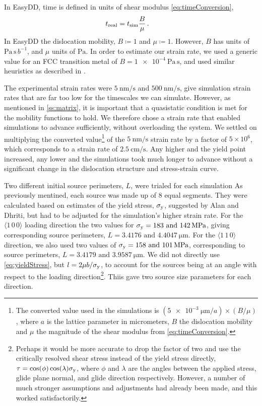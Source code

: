 In EasyDD, time is defined in units of shear modulus \cref{eq:timeConversion},
\begin{align}\label{eq:timeConversion}
    t_{\textrm{real}} & = t_{\textrm{sim}} \dfrac{B}{\mu}\,.
\end{align}
In EasyDD the dislocation mobility, $B \coloneqq 1$ and $\mu \coloneqq 1$. However, $B$ has units of $\si{\pascal\,\second\,b^{-1}}$, and $\mu$ units of $\si{\pascal}$. In order to estimate our strain rate, we used a generic value for an FCC transition metal of $B = \SI{1e-4}{\pascal\,\second}$, and used similar heuristics as described in \cite[p.~237]{ddlab}.

The experimental strain rates were $\SI{5}{\nano\metre\per\second}$ and $\SI{500}{\nano\metre\per\second}$, give simulation strain rates that are far too low for the timescales we can simulate. However, as mentioned in \cref{ss:matrix}, it is important that a quasistatic condition is met for the mobility functions to hold. We therefore chose a strain rate that enabled simulations to advance sufficiently, without overloading the system. We settled on multiplying the converted value\footnote{The converted value used in the simulations is $\left(\SI{5e-3}{\micro\metre}/a\right) \times \left(B /  \mu \right)$, where $a$ is the lattice parameter in micrometers, $B$ the dislocation mobility and $ \mu $ the magnitude of the shear modulus from \cref{eq:timeConversion}.} of the $\SI{5}{\nano\metre\per\second}$ strain rate by a factor of $5 \times 10^6$, which corresponds to a strain rate of $\SI{2.5}{\centi\metre\per\second}$. Any higher and the yield point increased, any lower and the simulations took much longer to advance without a significant change in the dislocation structure and stress-strain curve.

Two different initial source perimeters, $L$, were trialed for each simulation As previously mentined, each source was made up of 8 equal segments. They were calculated based on estimates of the yield stress, $\sigma_{\textrm{y}}$, suggested by Alan and Dhriti, but had to be adjusted for the simulation's higher strain rate. For the $\langle 1\, 0\, 0 \rangle$ loading direction the two values for $\sigma_{\textrm{y}} = 183 \text{ and } \SI{142}{\mega\pascal}$, giving corresponding source perimeters, $L = 3.4176 \text{ and } \SI{4.4047}{\micro\metre}$. For the $\langle 1\, 1\, 0 \rangle$ direction, we also used two values of $\sigma_{\textrm{y}} = 158 \text{ and } \SI{101}{\mega\pascal}$, corresponding to source perimeters, $L = 3.4179 \text{ and } \SI{3.9587}{\micro\metre}$. We did not directly use \cref{eq:yieldStress}, but $l = 2 \mu b / \sigma_{\textrm{y}}$, to account for the sources being at an angle with respect to the loading direction\footnote{Perhaps it would be more accurate to drop the factor of two and use the critically resolved shear stress instead of the yield stress directly, $\tau = \cos(\phi)\cos(\lambda) \sigma_{\textrm{y}}$, where $\phi$ and $\lambda$ are the angles between the applied stress, glide plane normal, and glide direction respectively. However, a number of much stronger assumptions and adjustments had already been made, and this worked satisfactorily.}. Thiis gave two source size parameters for each direction.

